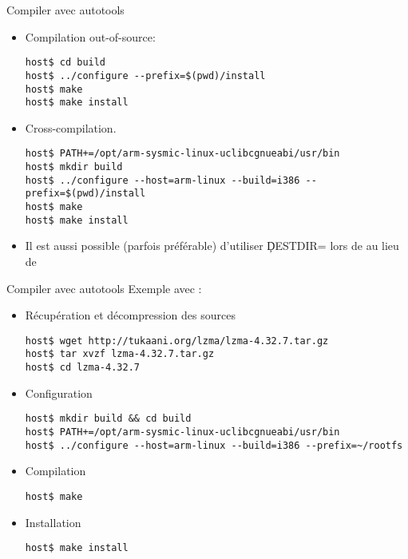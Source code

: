 \begin{frame}[fragile=singleslide]{Compiler avec autotools}
  \begin{itemize}
  \item  Compilation out-of-source:
    \begin{lstlisting}
host$ cd build
host$ ../configure --prefix=$(pwd)/install
host$ make
host$ make install
    \end{lstlisting} %
  \item  Cross-compilation.
    \begin{lstlisting}
host$ PATH+=/opt/arm-sysmic-linux-uclibcgnueabi/usr/bin
host$ mkdir build
host$ ../configure --host=arm-linux --build=i386 --prefix=$(pwd)/install
host$ make
host$ make install
    \end{lstlisting} %
  \item  Il   est  aussi  possible   (parfois  préférable)  d'utiliser
    \c{DESTDIR=} lors de  au lieu de 
  \end{itemize}
\end{frame}

\begin{frame}[fragile=singleslide]{Compiler avec autotools}
  Exemple avec :
  \begin{itemize}
  \item Récupération et décompression des sources
\begin{lstlisting}
host$ wget http://tukaani.org/lzma/lzma-4.32.7.tar.gz
host$ tar xvzf lzma-4.32.7.tar.gz
host$ cd lzma-4.32.7
\end{lstlisting} %
  \item Configuration
\begin{lstlisting}
host$ mkdir build && cd build
host$ PATH+=/opt/arm-sysmic-linux-uclibcgnueabi/usr/bin
host$ ../configure --host=arm-linux --build=i386 --prefix=~/rootfs
\end{lstlisting} %
  \item Compilation
\begin{lstlisting}
host$ make
\end{lstlisting} %
  \item Installation
\begin{lstlisting}
host$ make install
\end{lstlisting} %
  \end{itemize}
\end{frame}

